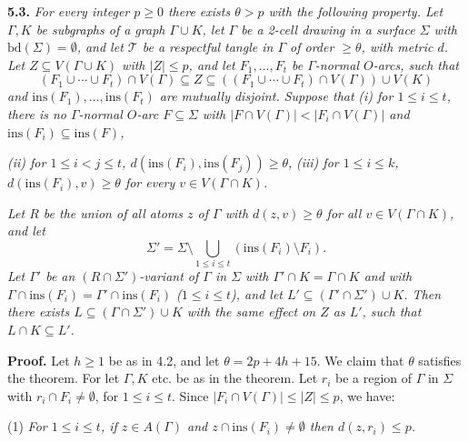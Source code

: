 \textbf{5.3.} \textit{For every integer $p \ge 0$ there exists $\theta > p$ with the following property. Let $\Gamma, K$ be subgraphs of a graph $\Gamma \cup K$, let $\Gamma$ be a 2-cell drawing in a surface $\Sigma$ with $\text{bd}(\Sigma) = \emptyset$, and let $\mathcal{T}$ be a respectful tangle in $\Gamma$ of order $\ge \theta$, with metric $d$. Let $Z \subseteq V(\Gamma \cup K)$ with $|Z| \le p$, and let $F_1, \ldots, F_t$ be $\Gamma$-normal $O$-arcs, such that}
\begin{equation*}
(F_1 \cup \cdots \cup F_t) \cap V(\Gamma) \subseteq Z \subseteq ((F_1 \cup \cdots \cup F_t) \cap V(\Gamma)) \cup V(K)
\end{equation*}
\textit{and $\text{ins}(F_1), \ldots, \text{ins}(F_t)$ are mutually disjoint. Suppose that} \textit{(i) for $1 \le i \le t$, there is no $\Gamma$-normal $O$-arc $F \subseteq \Sigma$ with $|F \cap V(\Gamma)| < |F_i \cap V(\Gamma)|$ and $\text{ins}(F_i) \subseteq \text{ins}(F)$,}

\textit{(ii) for $1 \le i < j \le t$, $d(\text{ins}(F_i), \text{ins}(F_j)) \ge \theta$,} \textit{(iii) for $1 \le i \le k$, $d(\text{ins}(F_i), v) \ge \theta$ for every $v \in V(\Gamma \cap K)$.}

\textit{Let $R$ be the union of all atoms $z$ of $\Gamma$ with $d(z, v) \ge \theta$ for all $v \in V(\Gamma \cap K)$, and let}
\begin{equation*}
\Sigma' = \Sigma \setminus \bigcup_{1 \le i \le t} (\text{ins}(F_i) \setminus F_i).
\end{equation*}
\textit{Let $\Gamma'$ be an $(R \cap \Sigma')$-variant of $\Gamma$ in $\Sigma$ with $\Gamma' \cap K = \Gamma \cap K$ and with $\Gamma \cap \text{ins}(F_i) = \Gamma' \cap \text{ins}(F_i)$ ($1 \le i \le t$), and let $L' \subseteq (\Gamma' \cap \Sigma') \cup K$. Then there exists $L \subseteq (\Gamma \cap \Sigma') \cup K$ with the same effect on $Z$ as $L'$, such that $L \cap K \subseteq L'$.}

\textbf{Proof.} Let $h \ge 1$ be as in 4.2, and let $\theta = 2p + 4h + 15$. We claim that $\theta$ satisfies the theorem. For let $\Gamma, K$ etc. be as in the theorem. Let $r_i$ be a region of $\Gamma$ in $\Sigma$ with $r_i \cap F_i \ne \emptyset$, for $1 \le i \le t$. Since $|F_i \cap V(\Gamma)| \le |Z| \le p$, we have:

\hspace*{12pt}(1) \textit{For $1 \le i \le t$, if $z \in A(\Gamma)$ and $z \cap \text{ins}(F_i) \ne \emptyset$ then $d(z, r_i) \le p$.}
